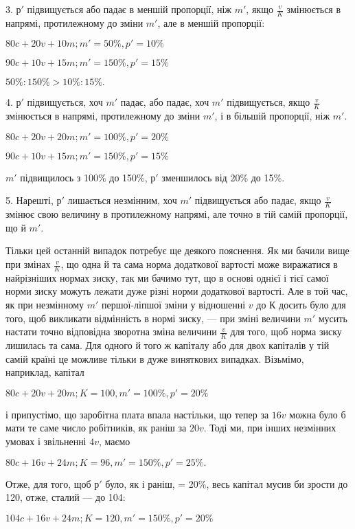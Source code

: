 
3. $р'$ підвищується або падає в меншій пропорції, ніж $m'$,
якщо $\frac{v}{K}$ змінюється в напрямі, протилежному до зміни $m'$, але
в меншій пропорції:

\begin{center}
$80c + 20 v + 10 m; m' = 50\%, p' = 10\%$

$90 c + 10 v + 15 m; m' = 150\%, p' = 15\%$

$50\% : 150\% > 10\% : 15\%.$
\end{center}

4. $р'$ підвищується, хоч $m'$ падає, або падає, хоч $m'$ підвищується,
якщо $\frac{v}{K}$ змінюється в напрямі, протилежному до зміни
$m'$, і в більшій пропорції, ніж $m'$.

\begin{center}
$80c + 20 v + 20 m; m' = 100\%, p' = 20\%$

$90 c + 10 v + 15 m; m' = 150\%, p' = 15\%$
\end{center}

\noindent $m'$ підвищилось з 100\% до 150\%, $р'$ зменшилось від 20\% до 15\%.

5. Нарешті, $р'$ лишається незмінним, хоч $m'$ підвищується або
падає, якщо $\frac{v}{K}$ змінює свою величину в протилежному напрямі,
але точно в тій самій пропорції, що й $m'$.

Тільки цей останній випадок потребує ще деякого пояснення.
Як ми бачили вище при змінах $\frac{v}{K}$, що одна й та сама норма
додаткової вартості може виражатися в найрізніших нормах
зиску, так ми бачимо тут, що в основі однієї і тієї самої норми
зиску можуть лежати дуже різні норми додаткової вартості.
Але в той час, як при незмінному $m'$ першої-ліпшої зміни у відношенні
$v$ до $К$ досить було для того, щоб викликати відмінність
в нормі зиску, $—$ при зміні величини $m'$ мусить настати точно
відповідна зворотна зміна величини $\frac{v}{K}$ для того, щоб норма
зиску лишилась та сама. Для одного й того ж капіталу або для
двох капіталів у тій самій країні це можливе тільки в дуже
виняткових випадках. Візьмімо, наприклад, капітал

\begin{center}
$80c + 20 v + 20 m; K = 100, m' = 100\%, p' = 20\%$
\end{center}

\noindent і припустімо, що заробітна плата впала настільки, що тепер за
$16 v$ можна було б мати те саме число робітників, як раніш за
$20 v$. Тоді ми, при інших незмінних умовах і звільненні $4 v$,
маємо

\begin{center}
$80c + 16 v + 24 m; K = 96, m' = 150\%, p' = 25\%.$
\end{center}

Отже, для того, щоб $р'$ було, як і раніш, = 20\%, весь капітал
мусив би зрости до 120, отже, сталий $—$ до 104:

\begin{center}
$104 c + 16 v + 24 m; K = 120, m' = 150\%, p' = 20\%$
\end{center}
